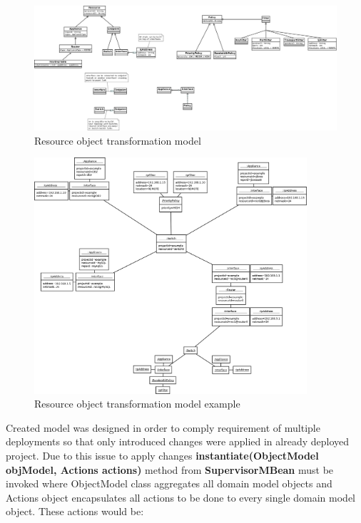 \documentclass[11pt]{book}
\begin{document}
		\begin{figure}[H]
			\begin{center}
				\includegraphics[width=1.2\textwidth, angle=90]{img/impl/resource-object-model.png}
			\end{center}
			\caption{Resource object transformation model}
		\end{figure}

		\begin{figure}[H]
			\begin{center}
				\includegraphics[width=0.9\textwidth]{img/impl/resource-object-model-example.png}
			\end{center}
			\caption{Resource object transformation model example}
		\end{figure}

		Created model was designed in order to comply requirement of multiple deployments so that only introduced changes
		were applied in already deployed project. Due to this issue to apply changes \textbf{instantiate(ObjectModel
		objModel, Actions actions)} method from \textbf{SupervisorMBean} must be invoked where ObjectModel class
		aggregates all domain model objects and Actions object encapsulates all actions to be done to every single domain
		model object. These actions would be:
\end{document}
